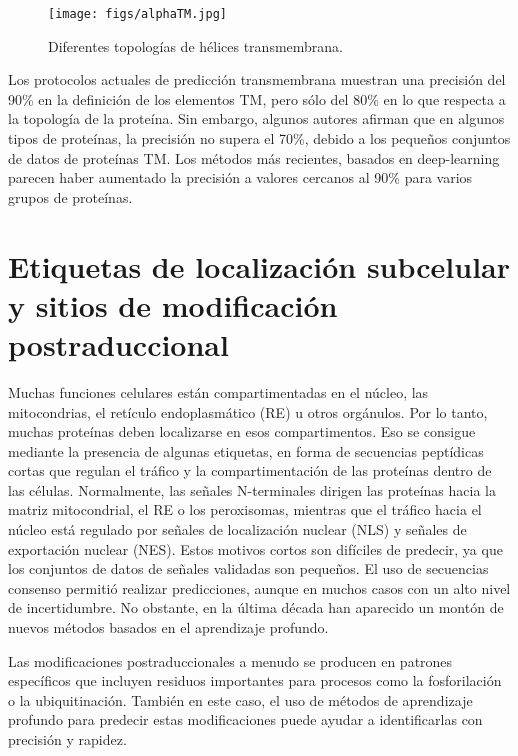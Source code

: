 \begin{figure}[h]
\centering
\texttt{[image: figs/alphaTM.jpg]}
\caption{Diferentes topologías de hélices transmembrana.}
\end{figure}

Los protocolos actuales de predicción transmembrana muestran una precisión del 90\% en la definición de los elementos TM, pero sólo del 80\% en lo que respecta a la topología de la proteína. Sin embargo, algunos autores afirman que en algunos tipos de proteínas, la precisión no supera el 70\%, debido a los pequeños conjuntos de datos de proteínas TM. Los métodos más recientes, basados en deep-learning parecen haber aumentado la precisión a valores cercanos al 90\% para varios grupos de proteínas.

\section{Etiquetas de localización subcelular y sitios de modificación postraduccional}
Muchas funciones celulares están compartimentadas en el núcleo, las mitocondrias, el retículo endoplasmático (RE) u otros orgánulos. Por lo tanto, muchas proteínas deben localizarse en esos compartimentos. Eso se consigue mediante la presencia de algunas etiquetas, en forma de secuencias peptídicas cortas que regulan el tráfico y la compartimentación de las proteínas dentro de las células. Normalmente, las señales N-terminales dirigen las proteínas hacia la matriz mitocondrial, el RE o los peroxisomas, mientras que el tráfico hacia el núcleo está regulado por señales de localización nuclear (NLS) y señales de exportación nuclear (NES). Estos motivos cortos son difíciles de predecir, ya que los conjuntos de datos de señales validadas son pequeños. El uso de secuencias consenso permitió realizar predicciones, aunque en muchos casos con un alto nivel de incertidumbre. No obstante, en la última década han aparecido un montón de nuevos métodos basados en el aprendizaje profundo. 

Las modificaciones postraduccionales a menudo se producen en patrones específicos que incluyen residuos importantes para procesos como la fosforilación o la ubiquitinación. También en este caso, el uso de métodos de aprendizaje profundo para predecir estas modificaciones puede ayudar a identificarlas con precisión y rapidez.

